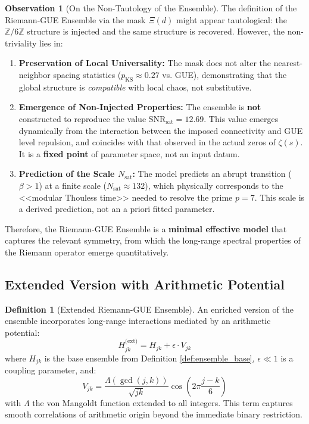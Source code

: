 \documentclass[12pt, a4paper]{article}
\theoremstyle{plain}
\theoremstyle{definition}
\newtheorem{definicion}[teorema]{Definition}
\newtheorem{observacion}[teorema]{Observation}
\theoremstyle{remark}
\begin{document}

\begin{observacion}[On the Non-Tautology of the Ensemble]
The definition of the Riemann-GUE Ensemble via the mask $\Xi(d)$ might appear tautological: the $\mathbb{Z}/6\mathbb{Z}$ structure is injected and the same structure is recovered. However, the non-triviality lies in:
\begin{enumerate}
    \item \textbf{Preservation of Local Universality:} The mask does not alter the nearest-neighbor spacing statistics ($p_{\text{KS}} \approx 0.27$ vs. GUE), demonstrating that the global structure is \textit{compatible} with local chaos, not substitutive.
    \item \textbf{Emergence of Non-Injected Properties:} The ensemble is \textbf{not} constructed to reproduce the value $\mathrm{SNR}_{\text{sat}} = 12.69$. This value emerges dynamically from the interaction between the imposed connectivity and GUE level repulsion, and coincides with that observed in the actual zeros of $\zeta(s)$. It is a \textbf{fixed point} of parameter space, not an input datum.
    \item \textbf{Prediction of the Scale $N_{\text{sat}}$:} The model predicts an abrupt transition ($\beta > 1$) at a finite scale ($N_{\text{sat}} \approx 132$), which physically corresponds to the <<modular Thouless time>> needed to resolve the prime $p=7$. This scale is a derived prediction, not an a priori fitted parameter.
\end{enumerate}
Therefore, the Riemann-GUE Ensemble is a \textbf{minimal effective model} that captures the relevant symmetry, from which the long-range spectral properties of the Riemann operator emerge quantitatively.
\end{observacion}

\subsection{Extended Version with Arithmetic Potential}
\label{subsec:version_extendida}

\begin{definicion}[Extended Riemann-GUE Ensemble]
An enriched version of the ensemble incorporates long-range interactions mediated by an arithmetic potential:
\[
H_{jk}^{\text{(ext)}} = H_{jk} + \epsilon \cdot V_{jk}
\]
where $H_{jk}$ is the base ensemble from Definition \ref{def:ensemble_base}, $\epsilon \ll 1$ is a coupling parameter, and:
\[
V_{jk} = \frac{\Lambda(\gcd(j,k))}{\sqrt{jk}} \cos\left(2\pi\frac{j-k}{6}\right)
\]
with $\Lambda$ the von Mangoldt function extended to all integers. This term captures smooth correlations of arithmetic origin beyond the immediate binary restriction.
\end{definicion}
\end{document}
